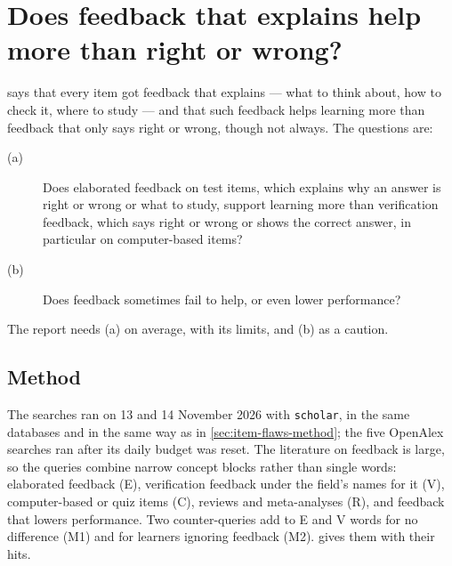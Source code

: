 \chapter{Does feedback that explains help more than right or wrong?}
\label{app:feedback}

 says that every item got feedback that explains ---
what to think about, how to check it, where to study --- and that such
feedback helps learning more than feedback that only says right or wrong,
though not always.  The questions are:
\begin{description}
  \item[(a)] Does elaborated feedback on test items, which explains why an
    answer is right or wrong or what to study, support learning more than
    verification feedback, which says right or wrong or shows the correct
    answer, in particular on computer-based items?
  \item[(b)] Does feedback sometimes fail to help, or even lower
    performance?
\end{description}
The report needs (a) on average, with its limits, and (b) as a caution.

\section{Method}
\label{sec:feedback-method}

The searches ran on 13 and 14 November 2026 with \texttt{scholar}, in the
same databases and in the same way as in \cref{sec:item-flaws-method};
the five OpenAlex searches ran after its daily budget was reset.  The
literature on feedback is large, so the queries combine narrow concept
blocks rather than single words: elaborated feedback (E), verification
feedback under the field's names for it (V), computer-based or quiz items
(C), reviews and meta-analyses (R), and feedback that lowers performance.
Two counter-queries add to E and V words for no difference (M1) and for
learners ignoring feedback (M2).   gives
them with their hits.


